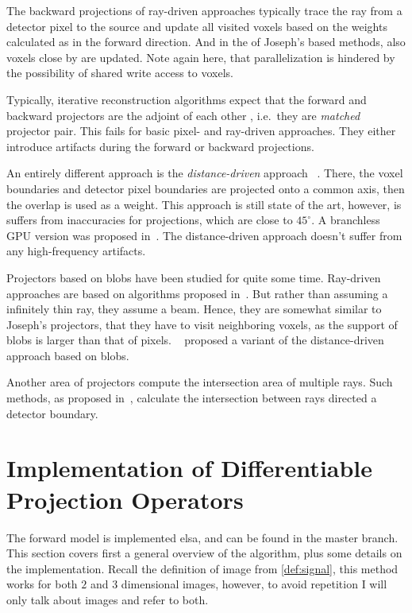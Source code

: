 The backward projections of ray-driven approaches typically trace the ray from a detector pixel to
the source and update all visited voxels based on the weights calculated as in the forward
direction. And in the of Joseph's based methods, also voxels close by are updated. Note again here,
that parallelization is hindered by the possibility of shared write access to voxels.

Typically, iterative reconstruction algorithms expect that the forward and backward projectors are
the adjoint of each other , i.e.\ they are
\textit{matched} projector pair. This fails for basic pixel- and ray-driven approaches.
They either introduce artifacts during the forward or backward projections.

An entirely different approach is the \textit{distance-driven} approach
~\cite{de_man_distance-driven_2002, de_man_distance-driven_2004}. There, the voxel boundaries and
detector pixel boundaries are projected onto a common axis, then the overlap is used as a weight.
This approach is still state of the art, however, is suffers from inaccuracies for projections, which
are close to \(45^\circ\). A branchless \gls{GPU} version was proposed in~\cite{liu_gpu-based_2017}. The
distance-driven approach doesn't suffer from any high-frequency artifacts.

Projectors based on blobs have been studied for quite some time. Ray-driven approaches are based on
algorithms proposed in~\cite{matej_practical_1996, popescu_ray_2004}. But rather than assuming a
infinitely thin ray, they assume a beam. Hence, they are somewhat similar to Joseph's projectors,
that they have to visit neighboring voxels, as the support of blobs is larger than that of pixels.
~\cite{levakhina_distance-driven_2010} proposed a variant of the distance-driven approach based on
blobs.

Another area of projectors compute the intersection area of multiple rays. Such methods, as proposed
in~\cite{ha_study_2015, ha_efficient_2016, ha_look-up_2018}, calculate the intersection between rays
directed a detector boundary.

\section{Implementation of Differentiable Projection Operators}\label{sec:implementation}

The forward model is implemented elsa, and can be found in the master branch. This section covers
first a general overview of the algorithm, plus some details on the implementation. Recall the
definition of image from \autoref{def:signal}, this method works for both \(2\) and \(3\) dimensional
images, however, to avoid repetition I will only talk about images and refer to both.

